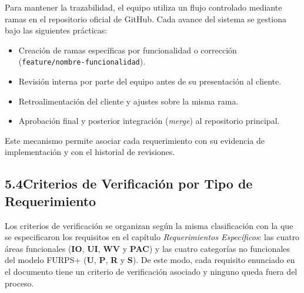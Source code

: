 \documentclass[12pt, letterpaper]{article}
\begin{document}
Para mantener la trazabilidad, el equipo utiliza un flujo controlado mediante ramas
en el repositorio oficial de GitHub. Cada avance del sistema se gestiona bajo las siguientes
prácticas:

\begin{itemize}[leftmargin=1.5em,itemsep=3pt]
  \item Creación de ramas específicas por funcionalidad o corrección
        (\texttt{feature/nombre-funcionalidad}).
  \item Revisión interna por parte del equipo antes de su presentación al cliente.
  \item Retroalimentación del cliente y ajustes sobre la misma rama.
  \item Aprobación final y posterior integración (\emph{merge}) al repositorio principal.
\end{itemize}

Este mecanismo permite asociar cada requerimiento con su evidencia de implementación y con
el historial de revisiones.

\subsection*{5.4\quad Criterios de Verificación por Tipo de Requerimiento}



Los criterios de verificación se organizan según la misma clasificación con la que
se especificaron los requisitos en el capítulo \textit{Requerimientos Específicos}: las cuatro
áreas funcionales (\textbf{IO}, \textbf{UI}, \textbf{WV} y \textbf{PAC}) y las cuatro
categorías no funcionales del modelo FURPS+ (\textbf{U}, \textbf{P}, \textbf{R} y
\textbf{S}). De este modo, cada requisito enunciado en el documento tiene un criterio
de verificación asociado y ninguno queda fuera del proceso.
\end{document}
